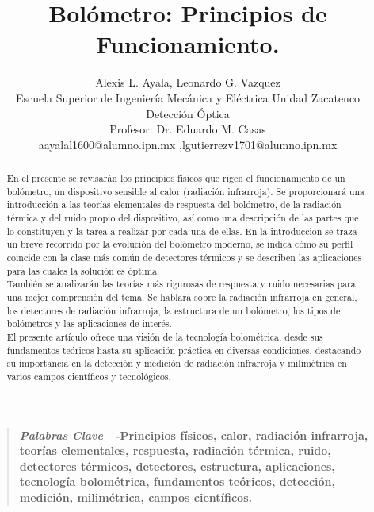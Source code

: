 \documentclass[a4paper,journal]{IEEEtran}
\begin{document}
\title{Bolómetro: Principios de Funcionamiento.\\}
\author{Alexis L. Ayala, Leonardo G. Vazquez\\Escuela Superior de Ingeniería Mecánica y Eléctrica Unidad Zacatenco\\ Detección Óptica\\Profesor: Dr. Eduardo M. Casas\\ aayalal1600@alumno.ipn.mx ,lgutierrezv1701@alumno.ipn.mx}
\maketitle
\begin{abstract}
En el presente se revisarán los principios físicos que rigen el funcionamiento de un bolómetro, un dispositivo sensible al calor (radiación infrarroja). Se proporcionará una introducción a las teorías elementales de respuesta del bolómetro, de la radiación térmica y del ruido propio del dispositivo, así como una descripción de las partes que lo constituyen y la tarea a realizar por cada una de ellas. En la introducción se traza un breve recorrido por la evolución del bolómetro moderno, se indica cómo su perfil coincide con la clase más común de detectores térmicos y se describen las aplicaciones para las cuales la solución es óptima.
\\También se analizarán las teorías más rigurosas de respuesta y ruido necesarias para una mejor comprensión del tema. Se hablará sobre la radiación infrarroja en general, los detectores de radiación infrarroja, la estructura de un bolómetro, los tipos de bolómetros y las aplicaciones de interés. 
\\El presente artículo ofrece una visión de la tecnología bolométrica, desde sus fundamentos teóricos hasta su aplicación práctica en diversas condiciones, destacando su importancia en la detección y medición de radiación infrarroja y milimétrica en varios campos científicos y tecnológicos. 
\end{abstract}
\begin{quote}
        \bf
        \small
        \emph{Palabras Clave}—-Principios físicos, calor, radiación infrarroja, teorías elementales, respuesta, radiación térmica, ruido, detectores térmicos, detectores, estructura, aplicaciones, tecnología bolométrica, fundamentos teóricos, detección, medición, milimétrica, campos científicos. 
\end{quote}
\end{document}

